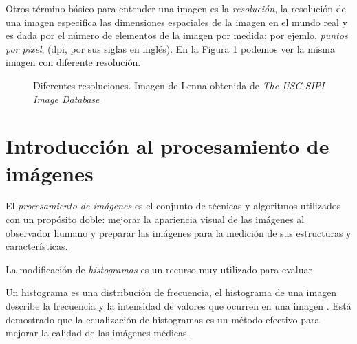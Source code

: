 Otros término básico para entender una imagen es la \textit{resolución}, la
resolución de una imagen especifica las dimensiones espaciales de la imagen en
el mundo real y es dada por el número de elementos de la imagen por medida; por
ejemlo, \textit{puntos por pixel}, (dpi, por sus siglas en inglés). En la
Figura \ref{resolution} podemos ver la misma imagen con diferente resolución.

\begin{figure}[h]
    \centering

  \caption{Diferentes resoluciones. Imagen de Lenna obtenida de
  \textit{The USC-SIPI Image Database}}
  
  \label{resolution}
\end{figure}

\section{Introducción al procesamiento de imágenes}

El \textit{procesamiento de imágenes} es el conjunto de técnicas y algoritmos
utilizados con un propósito doble: mejorar la apariencia visual de las imágenes
al observador humano y preparar las imágenes para la medición de sus
estructuras y características.

La modificación de \textit{histogramas} es un recurso muy utilizado para evaluar

Un histograma es una distribución de frecuencia, el histograma de una imagen
describe la frecuencia y la intensidad de valores que ocurren en una imagen
\cite{burger2008digital}. Está demostrado que la ecualización de histogramas es
un método efectivo para mejorar la calidad de las imágenes médicas.

